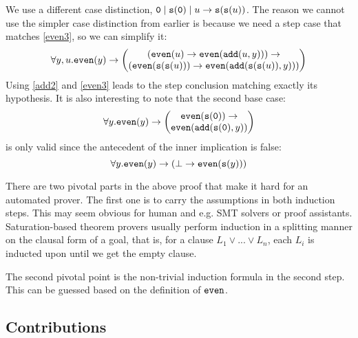 \begin{example}
	We use a different case distinction, $\mathtt{0}\mid\mathtt{s}(\mathtt{0})\mid u\rightarrow\mathtt{s}(\mathtt{s}(u))$. The reason we cannot use the simpler case distinction from earlier is because we need a step case that matches \eqref{even3}, so we can simplify it:
    $$\forall y,u. \mathtt{even}(y)\rightarrow\begin{pmatrix}(\mathtt{even}(u)\rightarrow\mathtt{even}(\mathtt{add}(u,y)))\rightarrow\\
    (\mathtt{even}(\mathtt{s}(\mathtt{s}(u)))\rightarrow\mathtt{even}(\mathtt{add}(\mathtt{s}(\mathtt{s}(u)),y)))\end{pmatrix}$$
    Using \eqref{add2} and \eqref{even3} leads to the step conclusion matching exactly its hypothesis. It is also interesting to note that the second base case:
	$$\forall y. \mathtt{even}(y)\rightarrow\begin{pmatrix}\mathtt{even}(\mathtt{s}(\mathtt{0}))\rightarrow\\
	\mathtt{even}(\mathtt{add}(\mathtt{s}(\mathtt{0}),y))\end{pmatrix}$$
	is only valid since the antecedent of the inner implication is false:
	$$\forall y. \mathtt{even}(y)\rightarrow(\bot\rightarrow\mathtt{even}(\mathtt{s}(y)))$$
\end{example}

There are two pivotal parts in the above proof that make it hard for an automated prover. The first one is to carry the assumptions in both induction steps. This may seem obvious for human and e.g. SMT solvers or proof assistants. Saturation-based theorem provers usually perform induction in a splitting manner on the clausal form of a goal, that is, for a clause $L_1\lor...\lor L_n$, each $L_i$ is inducted upon until we get the empty clause.

The second pivotal point is the non-trivial induction formula in the second step. This can be guessed based on the definition of $\mathtt{even}$.

\subsection{Contributions}

